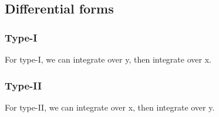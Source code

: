 
\subsection{Differential forms}

\subsubsection{Type-I}

For type-I, we can integrate over y, then integrate over x.

\subsubsection{Type-II}

For type-II, we can integrate over x, then integrate over y.


